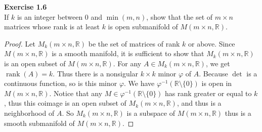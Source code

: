 \documentclass[12pt, a4paper]{article}
\theoremstyle{plain}
\newcommand{\R}{\mathbb{R}}
\def\phi{\varphi}
\DeclareMathOperator{\rank}{rank}
\newenvironment{exercise}[2][Exercise]
    { \begin{mdframed}[backgroundcolor=gray!20] \textbf{#1 #2} \\}
    {  \end{mdframed}}
\begin{document}
\begin{exercise}{1.6}
    If $k$ is an integer between $0$ and $\min(m,n)$, show that the set of $m\times n$ matrices whose rank is at least $k$ is open submanifold of $M(m\times n,\R)$.
\end{exercise}
    \begin{proof}
        Let $M_k(m\times n,\R)$ be the set of matrices of rank $k$ or above. Since $M(m\times n,\R)$ is a smooth manifold, it is sufficient to show that $M_k(m\times n,\R)$ is an open subset of $M(m\times n,\R)$. For any $A\in M_k(m\times n,\R)$, we get $\rank(A)=k$. Thus there is a nonsigular $k\times k$ minor $\phi$ of $A$. Because $\det$ is a continuous function, so is this minor $\phi$. We have $\phi^{-1}(\R\setminus\{0\})$ is open in $M(m\times n,\R)$. Notice that any $M\in \phi^{-1}(\R\setminus\{0\})$ has rank greater or equal to $k$, thus this coimage is an open subset of $M_k(m\times n,\R)$, and thus is a neighborhood of $A$. So $M_k(m\times n,\R)$ is a subspace of $M(m\times n,\R)$ thus is a smooth submanifold of $M(m\times n,\R)$.
    \end{proof}
    
\pagebreak
\end{document}

